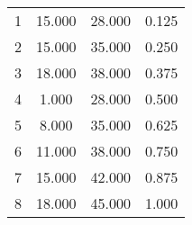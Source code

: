 % 
\begin{tabular}{cccc}
  \hline
  \hline
1 & 15.000 & 28.000 & 0.125 \\ 
  2 & 15.000 & 35.000 & 0.250 \\ 
  3 & 18.000 & 38.000 & 0.375 \\ 
  4 & 1.000 & 28.000 & 0.500 \\ 
  5 & 8.000 & 35.000 & 0.625 \\ 
  6 & 11.000 & 38.000 & 0.750 \\ 
  7 & 15.000 & 42.000 & 0.875 \\ 
  8 & 18.000 & 45.000 & 1.000 \\ 
   \hline
\end{tabular}
